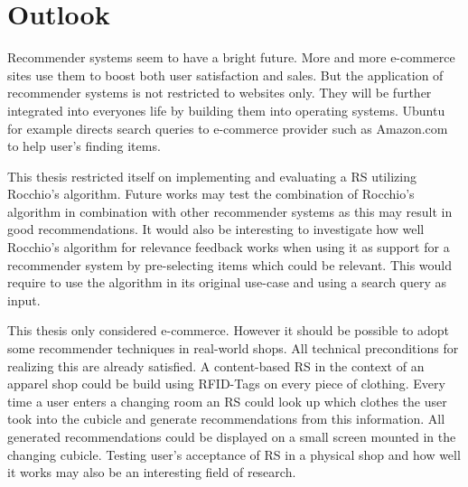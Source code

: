 

\section{Outlook}

Recommender systems seem to have a bright future.
More and more e-commerce sites use them to boost both user satisfaction and sales.
\citep[p.~4-7]{ricci:2011}
But the application of recommender systems is not restricted to websites only.
They will be further integrated into everyones life by building them into operating systems.
Ubuntu for example directs search queries to e-commerce provider such as Amazon.com to help user's finding items.\citep{ubuntu:2014}

This thesis restricted itself on implementing and evaluating a RS utilizing Rocchio's algorithm.
Future works may test the combination of Rocchio's algorithm in combination with other recommender systems as this may result in good recommendations.
It would also be interesting to investigate how well Rocchio's algorithm for relevance feedback works when using it as support for a recommender system by pre-selecting items which could be relevant.
This would require to use the algorithm in its original use-case and using a search query as input.

This thesis only considered e-commerce.
However it should be possible to adopt some recommender techniques in real-world shops.
All technical preconditions for realizing this are already satisfied.
A content-based RS in the context of an apparel shop could be build using RFID-Tags on every piece of clothing.
Every time a user enters a changing room an RS could look up which clothes the user took into the cubicle and generate recommendations from this information.
All generated recommendations could be displayed on a small screen mounted in the changing cubicle.
Testing user's acceptance of RS in a physical shop and how well it works may also be an interesting field of research.

